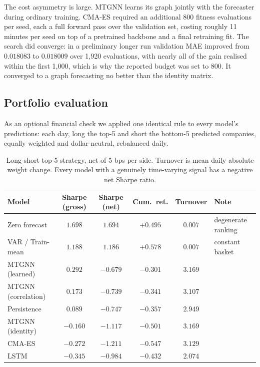 \begin{table}[H]
\centering

\caption{Mean wall-clock cost per seed on CPU. The CMA-ES search figure excludes backbone pretraining and the final retraining fit, both of which it also requires.}
\label{tab:cost}
\end{table}

The cost asymmetry is large. MTGNN learns its graph jointly with the forecaster during ordinary training. CMA-ES required an additional 800 fitness evaluations per seed, each a full forward pass over the validation set, costing roughly 11 minutes per seed on top of a pretrained backbone and a final retraining fit. The search did converge: in a preliminary longer run validation MAE improved from $0.018083$ to $0.018009$ over 1{,}920 evaluations, with nearly all of the gain realised within the first 1{,}000, which is why the reported budget was set to 800. It converged to a graph forecasting no better than the identity matrix.

\subsection{Portfolio evaluation}

As an optional financial check we applied one identical rule to every model's predictions: each day, long the top-5 and short the bottom-5 predicted companies, equally weighted and dollar-neutral, rebalanced daily.

\begin{table}[H]
\centering
\small
\setlength{\tabcolsep}{4.5pt}
\begin{tabular}{lccccl}
\toprule
Model & Sharpe (gross) & Sharpe (net) & Cum.\ ret. & Turnover & Note \\
\midrule
Zero forecast       & $1.698$  & $1.694$  & $+0.495$ & $0.007$ & degenerate ranking \\
VAR / Train-mean    & $1.188$  & $1.186$  & $+0.578$ & $0.007$ & constant basket \\
MTGNN (learned)     & $0.292$  & $-0.679$ & $-0.301$ & $3.169$ & \\
MTGNN (correlation) & $0.173$  & $-0.739$ & $-0.341$ & $3.107$ & \\
Persistence         & $0.089$  & $-0.747$ & $-0.357$ & $2.949$ & \\
MTGNN (identity)    & $-0.160$ & $-1.117$ & $-0.501$ & $3.169$ & \\
CMA-ES              & $-0.272$ & $-1.211$ & $-0.547$ & $3.129$ & \\
LSTM                & $-0.345$ & $-0.984$ & $-0.432$ & $2.074$ & \\
\bottomrule
\end{tabular}
\caption{Long-short top-5 strategy, net of 5 bps per side. Turnover is mean daily absolute weight change. Every model with a genuinely time-varying signal has a negative net Sharpe ratio.}
\label{tab:portfolio}
\end{table}

